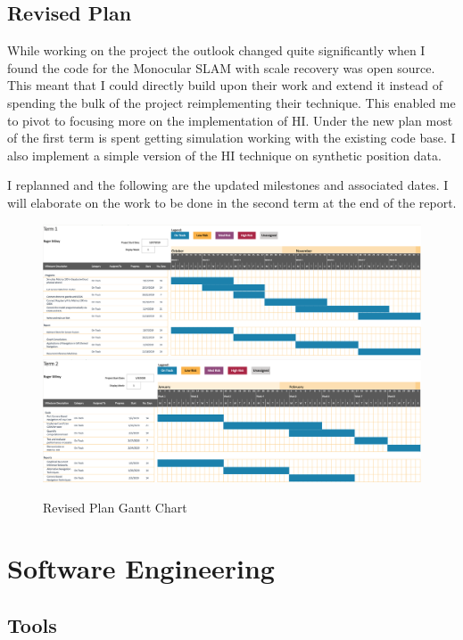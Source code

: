 \documentclass[]{../resources/final_report}
\begin{document}
\pagebreak
\section{Revised Plan}

While working on the project the outlook changed quite significantly when I found the code for 
the Monocular SLAM with scale recovery was open source. This meant that I could directly build 
upon their work and extend it instead of spending the bulk of the project reimplementing their 
technique. This enabled me to pivot to focusing more on the implementation of HI. 
Under the new plan most of the first term is spent getting simulation working with the existing 
code base. I also implement a simple version of the HI technique on synthetic 
position data.

I replanned and the following are the updated milestones and associated dates. I will elaborate 
on the work to be done in the second term at the end of the report.
\\
\begin{figure}[h]
  \centering
  \includegraphics[width=\textwidth]{Term1GanttChart.png}
  \includegraphics[width=\textwidth]{Term2GanttChart.png}
  \caption{Revised Plan Gantt Chart}
  \label{}
\end{figure}


\chapter{Software Engineering}

\section{Tools}
\end{document}
